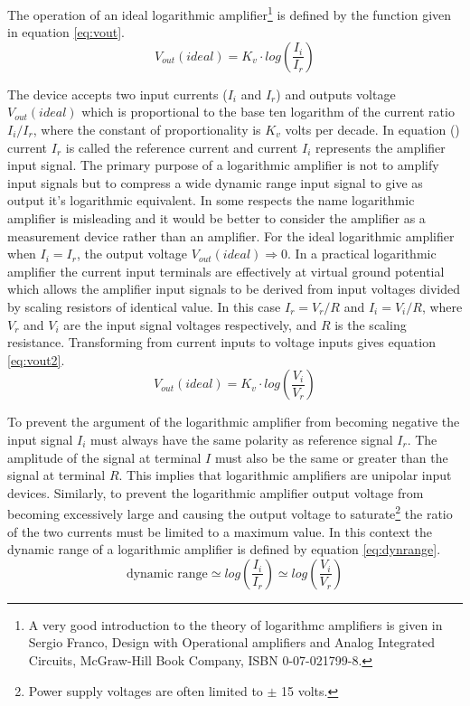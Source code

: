 
The operation of an ideal logarithmic amplifier\footnote{A very good
introduction to the theory of logarithmc amplifiers is given in Sergio
Franco, Design with Operational amplifiers and Analog Integrated
Circuits, McGraw-Hill Book Company, ISBN 0-07-021799-8.} is defined by
the function given in equation \eqref{eq:vout}.
\begin{equation}
\label{eq:vout}
V_{out}(ideal)=K_{v}\cdot log\left( \dfrac{I_{i}}{I_{r}}\right)
\end{equation}

The device accepts two input currents ($I_{i}$ and $I_{r}$) and
outputs voltage $V_{out}(ideal)$ which is proportional to the base ten
logarithm of the current ratio $I_{i}/I_{r}$, where the constant of
proportionality is $K_{v}$ volts per decade.  In equation
() current $I_{r}$ is called the reference current
and current $I_{i}$ represents the amplifier input signal. The primary
purpose of a logarithmic amplifier is not to amplify input signals but
to compress a wide dynamic range input signal to give as output it's
logarithmic equivalent. In some respects the name logarithmic
amplifier is misleading and it would be better to consider the
amplifier as a measurement device rather than an amplifier.  For the
ideal logarithmic amplifier when $I_{i}=I_{r}$, the output voltage
$V_{out}(ideal) \Rightarrow 0$. In a practical logarithmic amplifier
the current input terminals are effectively at virtual ground
potential which allows the amplifier input signals to be derived from
input voltages divided by scaling resistors of identical value. In
this case $I_{r}=V_{r}/R$ and $I_{i}=V_{i}/R$, where $V_{r}$ and
$V_{i}$ are the input signal voltages respectively, and $R$ is the
scaling resistance.  Transforming from current inputs to voltage
inputs gives equation \eqref{eq:vout2}.
\begin{equation}
\label{eq:vout2}
V_{out}(ideal)=K_{v}\cdot log\left( \dfrac{V_{i}}{V_{r}}\right)
\end{equation}

To prevent the argument of the logarithmic amplifier from becoming
negative the input signal $I_{i}$ must always have the same polarity
as reference signal $I_{r}$. The amplitude of the signal at terminal
$I$ must also be the same or greater than the signal at terminal
$R$. This implies that logarithmic amplifiers are unipolar input
devices.  Similarly, to prevent the logarithmic amplifier output
voltage from becoming excessively large and causing the output voltage
to saturate\footnote{Power supply voltages are often limited to $\pm$
15 volts.} the ratio of the two currents must be limited to a maximum
value. In this context the dynamic range of a logarithmic amplifier is
defined by equation \eqref{eq:dynrange}.
\begin{equation}
\label{eq:dynrange}
\textrm{dynamic  range} \simeq log\left( \dfrac{I_{i}}{I_{r}}\right) \simeq log\left( \dfrac{V_{i}}{V_r}\right)
\end{equation}


